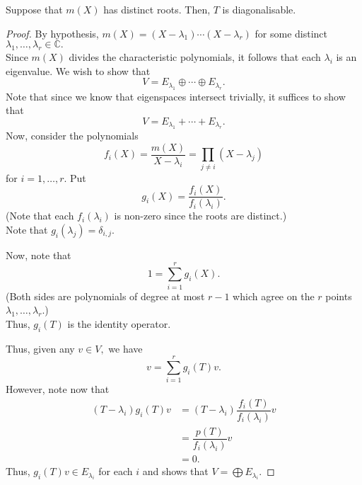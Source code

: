 \begin{prop}
	Suppose that $m(X)$ has distinct roots. Then, $T$ is diagonalisable.
\end{prop}
\begin{proof} 
	By hypothesis, $m(X) = (X - \lambda_1)\cdots(X - \lambda_r)$ for some distinct $\lambda_1, \ldots, \lambda_r \in \mathbb{C}.$\\
	Since $m(X)$ divides the characteristic polynomials, it follows that each $\lambda_i$ is an eigenvalue. We wish to show that
	\begin{equation*} 
		V = E_{\lambda_1} \oplus \cdots \oplus E_{\lambda_r}.
	\end{equation*}
	Note that since we know that eigenspaces intersect trivially, it suffices to show that
	\begin{equation*} 
		V = E_{\lambda_1} + \cdots + E_{\lambda_r}.
	\end{equation*}
	Now, consider the polynomials
	\begin{equation*} 
		f_i(X) = \dfrac{m(X)}{X - \lambda_i} = \prod_{j \neq i}(X - \lambda_j)
	\end{equation*}
	for $i = 1, \ldots, r.$ Put
	\begin{equation*} 
		g_i(X) = \dfrac{f_i(X)}{f_i(\lambda_i)}.
	\end{equation*}
	(Note that each $f_i(\lambda_i)$ is non-zero since the roots are distinct.)\\
	Note that $g_i(\lambda_j) = \delta_{i, j}.$

	Now, note that
	\begin{equation*} 
		1 = \sum_{i = 1}^{r} g_i(X).
	\end{equation*}
	(Both sides are polynomials of degree at most $r - 1$ which agree on the $r$ points $\lambda_1, \ldots, \lambda_r.$)\\
	Thus, $g_i(T)$ is the identity operator.

	Thus, given any $v \in V,$ we have
	\begin{equation} \tag{$\sum$} \label{eq:sumeigenvectors}
		v = \sum_{i = 1}^{r} g_i(T)v.
	\end{equation}
	However, note now that
	\begin{align*} 
		(T - \lambda_i)g_i(T)v &= (T - \lambda_i)\dfrac{f_i(T)}{f_i(\lambda_i)}v\\
		&= \dfrac{p(T)}{f_i(\lambda_i)}v\\
		&= 0.
	\end{align*}
	Thus, $g_i(T)v \in E_{\lambda_i}$ for each $i$ and  shows that $V = \bigoplus E_{\lambda_i}.$ 
\end{proof}	

